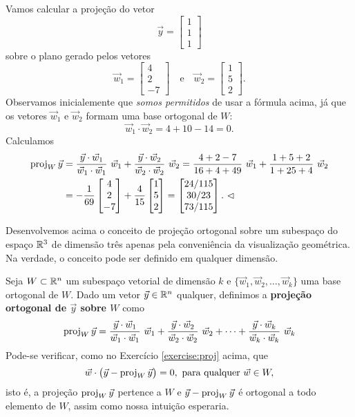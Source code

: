 \documentclass[../livro.tex]{subfiles}  %
\begin{document}
\begin{example}
Vamos calcular a projeção do vetor
\[
\vec{y} =
\begin{bmatrix}
 1\\1\\1
\end{bmatrix}
\] sobre o plano gerado pelos vetores
\[
\vec{w}_1 =
\begin{bmatrix}
 4\\2\\-7
\end{bmatrix} \quad \text{e} \quad
\vec{w}_2 =
\begin{bmatrix}
 1\\5\\2
\end{bmatrix}.
\] Observamos inicialemente que \textit{somos permitidos} de usar a fórmula acima, já que os vetores $\vec{w}_1$ e $\vec{w}_2$ formam uma base ortogonal de $W$:
\[
\vec{w}_1 \cdot \vec{w}_2 = 4 + 10 -14 = 0.
\] Calculamos
  \begin{align*}
\operatorname{proj}_W \vec{y} & = \frac{\vec{y} \cdot \vec{w}_1}{\vec{w}_1 \cdot \vec{w}_1} \ \vec{w}_1 + \frac{\vec{y} \cdot \vec{w}_2}{\vec{w}_2 \cdot \vec{w}_2} \ \vec{w}_2 = \frac{4 + 2 -7}{16 + 4 + 49} \ \vec{w}_1 + \frac{1 + 5 + 2}{1+25+4} \ \vec{w}_2 \\
                & = -\frac{1}{69}
                \begin{bmatrix}
 4\\2\\-7
\end{bmatrix}
                + \frac{4}{15}
\begin{bmatrix}
 1\\5\\2
\end{bmatrix} =
\begin{bmatrix}
 24/115 \\ 30/23 \\ 73/115
\end{bmatrix}. \ \lhd
  \end{align*}
\end{example}


Desenvolvemos acima o conceito de projeção ortogonal sobre um subespaço do espaço $\mathbb{R}^3$ de dimensão três apenas pela conveniência da visualização geométrica. Na verdade, o conceito pode ser definido em qualquer dimensão.

Seja $W \subset \mathbb{R}^n$ um subespaço vetorial de dimensão $k$ e $\{\vec{w}_1, \vec{w}_2, \dots, \vec{w}_k \}$ uma base ortogonal de $W$. Dado um vetor $\vec{y} \in \mathbb{R}^n$ qualquer, definimos a \textbf{projeção ortogonal de $\vec{y}$ sobre $W$} como
\[
\proj_W \vec{y}  = \frac{\vec{y} \cdot \vec{w}_1}{\vec{w}_1 \cdot \vec{w}_1} \ \vec{w}_1 + \frac{\vec{y} \cdot \vec{w}_2}{\vec{w}_2 \cdot \vec{w}_2} \ \vec{w}_2 + \cdots + \frac{\vec{y} \cdot \vec{w}_k}{\vec{w}_k \cdot \vec{w}_k} \ \vec{w}_k
\] Pode-se verificar, como no Exercício \ref{exercise:proj} acima, que
\[
\vec{w} \cdot  \big( \vec{y} - \operatorname{proj}_W \vec{y} \big) = 0, \ \text{para qualquer } \vec{w} \in W,
\] isto é, a projeção $\operatorname{proj}_W \vec{y}$ pertence a $W$ e $\vec{y} - \operatorname{proj}_W \vec{y}$ é ortogonal a todo elemento de $W$, assim como nossa intuição esperaria.
\end{document}
